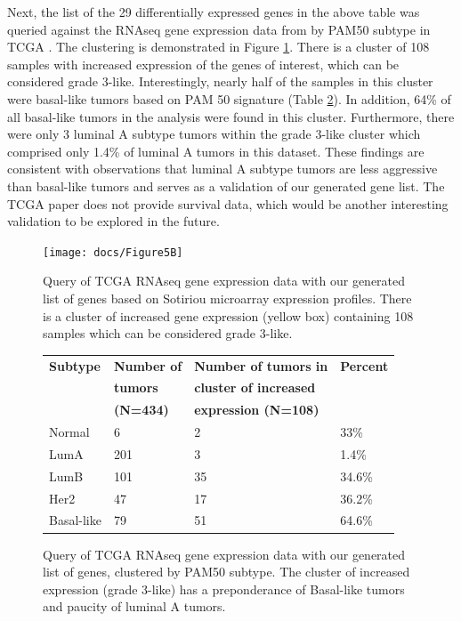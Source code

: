 \documentclass[a4paper,10pt]{article}
\begin{document}
Next, the list of the 29 differentially expressed genes in the above table was queried against 
the RNAseq gene expression data from by PAM50 subtype in TCGA \cite{Nature1}.  
The clustering is demonstrated in Figure \ref{5B}.  There is a cluster of 108 samples with 
increased expression of the genes of interest, which can be considered grade 3-like. 
 Interestingly, nearly half of the samples in this cluster were basal-like tumors based on 
PAM 50 signature (Table \ref{T2}).  In addition, 64\% of all basal-like tumors in the 
analysis were found in this cluster. Furthermore, there were only 3 luminal A subtype
 tumors within the grade 3-like cluster which comprised only 1.4\% of luminal A tumors
 in this dataset. These findings are consistent with observations that luminal A subtype
 tumors are less aggressive than basal-like tumors and serves as a validation of our 
generated gene list. The TCGA paper does not provide survival data, which would 
be another interesting validation to be explored in the future.

 \begin{figure}
\centering
\texttt{[image: docs/Figure5B]}
\caption{ Query of TCGA RNAseq gene expression data with our generated list of genes 
based on Sotiriou microarray expression profiles.  There is a cluster of increased gene 
expression (yellow box) containing 108 samples which can be considered grade 3-like.}\label{5B}
\end{figure}


\begin{figure}
\begin{tabular}{| l | l | l | l | }
    \hline
\textbf{Subtype} & \textbf{Number of} & \textbf{Number of tumors in } & \textbf{Percent}\\  
 &   \textbf{tumors}  & \textbf{cluster of increased} & \\
 &  \textbf{ (N=434)} & \textbf{expression (N=108)} & \\
\hline
Normal & 6 & 2 & 33\% \\ \hline 
 LumA & 201 & 3 & 1.4\% \\ \hline 
 LumB & 101 & 35 & 34.6\% \\ \hline 
 Her2 & 47 & 17 & 36.2\% \\ \hline 
 Basal-like & 79 & 51 & 64.6\% \\ \hline 
\end{tabular}
\caption{Query of TCGA RNAseq gene expression data with our generated list of genes,
 clustered by PAM50 subtype.  The cluster of increased expression (grade 3-like) has a preponderance 
of Basal-like tumors and paucity of luminal A tumors.}\label{T2}
\end{figure}
\end{document}
